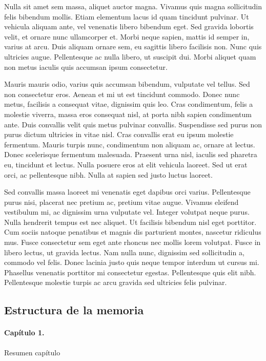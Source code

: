Nulla sit amet sem massa, aliquet auctor magna. Vivamus quis magna sollicitudin felis bibendum mollis. Etiam elementum lacus id quam tincidunt pulvinar. Ut vehicula aliquam ante, vel venenatis libero bibendum eget. Sed gravida lobortis velit, et ornare nunc ullamcorper et. Morbi neque sapien, mattis id semper in, varius at arcu. Duis aliquam ornare sem, eu sagittis libero facilisis non. Nunc quis ultricies augue. Pellentesque ac nulla libero, ut suscipit dui. Morbi aliquet quam non metus iaculis quis accumsan ipsum consectetur.

Mauris mauris odio, varius quis accumsan bibendum, vulputate vel tellus. Sed non consectetur eros. Aenean et mi ut est tincidunt commodo. Donec nunc metus, facilisis a consequat vitae, dignissim quis leo. Cras condimentum, felis a molestie viverra, massa eros consequat nisl, at porta nibh sapien condimentum ante. Duis convallis velit quis metus pulvinar convallis. Suspendisse sed purus non purus dictum ultricies in vitae nisl. Cras convallis erat eu ipsum molestie fermentum. Mauris turpis nunc, condimentum non aliquam ac, ornare at lectus. Donec scelerisque fermentum malesuada. Praesent urna nisl, iaculis sed pharetra eu, tincidunt et lectus. Nulla posuere eros at elit vehicula laoreet. Sed ut erat orci, ac pellentesque nibh. Nulla at sapien sed justo luctus laoreet.

Sed convallis massa laoreet mi venenatis eget dapibus orci varius. Pellentesque purus nisi, placerat nec pretium ac, pretium vitae augue. Vivamus eleifend vestibulum mi, ac dignissim urna vulputate vel. Integer volutpat neque purus. Nulla hendrerit tempus est nec aliquet. Ut facilisis bibendum nisl eget porttitor. Cum sociis natoque penatibus et magnis dis parturient montes, nascetur ridiculus mus. Fusce consectetur sem eget ante rhoncus nec mollis lorem volutpat. Fusce in libero lectus, ut gravida lectus. Nam nulla nunc, dignissim sed sollicitudin a, commodo vel felis. Donec lacinia justo quis neque tempor interdum ut cursus mi. Phasellus venenatis porttitor mi consectetur egestas. Pellentesque quis elit nibh. Pellentesque molestie turpis ac arcu gravida sed ultricies felis pulvinar.

%
%
\subsection*{Estructura de la memoria}

\paragraph*{Capítulo 1.}
Resumen capítulo

